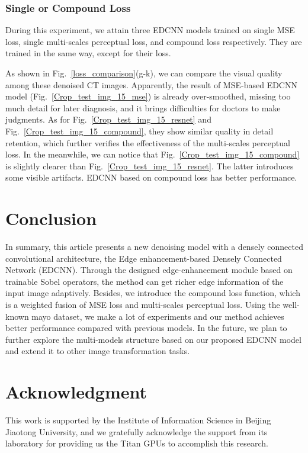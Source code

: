 \documentclass[conference]{IEEEtran}
\begin{document}
            \medskip

            \subsubsection{Single or Compound Loss}
                During this experiment, we attain three EDCNN models trained on single MSE loss, single multi-scales perceptual loss, and compound loss respectively.
They are trained in the same way, except for their loss.

                As shown in Fig.~\ref{loss_comparison}(g-k), we can compare the visual quality among these denoised CT images.
                Apparently, the result of MSE-based EDCNN model (Fig.~\ref{Crop_test_img_15_mse}) is already over-smoothed, missing too much detail for later diagnosis, and it brings difficulties for doctors to make judgments.
                As for Fig.~\ref{Crop_test_img_15_resnet} and Fig.~\ref{Crop_test_img_15_compound}, they show similar quality in detail retention, which further verifies the effectiveness of the multi-scales perceptual loss.
                In the meanwhile, we can notice that Fig.~\ref{Crop_test_img_15_compound} is slightly clearer than Fig.~\ref{Crop_test_img_15_resnet}.
                The latter introduces some visible artifacts.
                EDCNN based on compound loss has better performance.

    \section{Conclusion}
        In summary, this article presents a new denoising model with a densely connected convolutional architecture, the Edge enhancement-based Densely Connected Network (EDCNN). 
        Through the designed edge-enhancement module based on trainable Sobel operators, the method can get richer edge information of the input image adaptively.
        Besides, we introduce the compound loss function, which is a weighted fusion of MSE loss and multi-scales perceptual loss.
        Using the well-known mayo dataset, we make a lot of experiments and our method achieves better performance compared with previous models.
        In the future, we plan to further explore the multi-models structure based on our proposed EDCNN model and extend it to other image transformation tasks.

    \section*{Acknowledgment}
        This work is supported by the Institute of Information Science in Beijing Jiaotong University, 
        and we gratefully acknowledge the support from its laboratory for providing us the Titan GPUs to accomplish this research.

    
\end{document}
